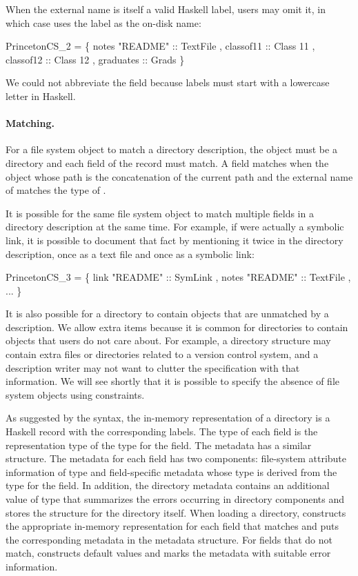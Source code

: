 When the external name is itself a valid Haskell label, users may omit
it, in which case \forest{} uses the label as the on-disk name:
\begin{code}
 PrincetonCS_2 = 
  \{ notes  "README" :: TextFile
  , classof11 :: Class 11
  , classof12 :: Class 12
  , graduates :: Grads \}
\end{code}
We could not abbreviate the  field because labels must start
with a lowercase letter in Haskell. 

\paragraph*{Matching.}
For a file system object to match a directory description, the object must be a
directory and each field of the record must match.  A field  matches
when the object whose path is the concatenation of the current path
and the external name of  matches the type of .

It is possible for the same file system object to match multiple
fields in a directory description at the same time.  For example, if
 were actually a symbolic link, it is possible to
document that fact by mentioning it twice in the directory
description, once as a text file and once as a symbolic link:
\begin{code}
 PrincetonCS_3 = 
  \{ link   "README" :: SymLink
  , notes  "README" :: TextFile
  , ... \}
\end{code}

It is also possible for a directory to contain objects
that are unmatched by a description.  We allow extra items because it
is common for directories to contain objects that users do not care
about.  For example, a directory structure may contain extra files or
directories related to a version control system, and a
description writer may not want to clutter the \forest{} specification
with that information.  We will see shortly that it is possible to
specify the absence of file system objects using constraints.

As suggested by the syntax, the in-memory representation of a
directory is a Haskell record with the corresponding labels.  The type
of each field is the representation type of the \forest{} type for the
field. The metadata has a similar structure. The metadata for
each field has two components: file-system attribute information of
type  and field-specific metadata whose type is derived
from the \forest{} type for the field.  In addition, the directory
metadata contains an additional value of type  that 
summarizes the errors occurring in directory components and stores the
 structure for 
the directory itself.
When loading a directory, \forest{} constructs the appropriate in-memory
representation for each field that matches and puts the corresponding
metadata in the metadata structure. For fields that do not 
match, \forest{} constructs default values and marks the metadata with
suitable error information.

